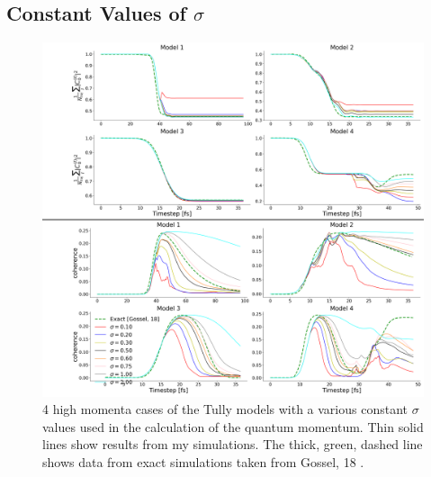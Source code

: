 \subsection{Constant Values of $\sigma$}
\begin{figure}[ht]
  \includegraphics[width=\textwidth]{./img/CTMQC/TullyModels/CTMQC_VarSig_highMom.png}
  \caption{\label{fig:VaryingSigmaTullyModels}4 high momenta cases of the Tully models with a various constant $\sigma$ values used in the calculation of the quantum momentum. Thin solid lines show results from my simulations. The thick, green, dashed line shows data from exact simulations taken from Gossel, 18 \cite{gossel_coupled-trajectory_2018}.}
\end{figure}
